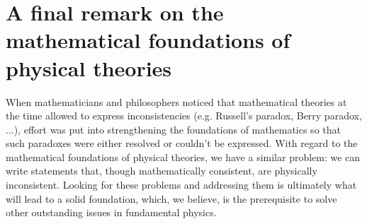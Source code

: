 \documentclass[10pt,twocolumn, nofootinbib]{revtex4-2}
\begin{document}

\section{A final remark on the mathematical foundations of physical theories}

When mathematicians and philosophers noticed that mathematical theories at the time allowed to express inconsistencies (e.g. Russell's paradox, Berry paradox, ...), effort was put into strengthening the foundations of mathematics so that such paradoxes were either resolved or couldn't be expressed. With regard to the mathematical foundations of physical theories, we have a similar problem: we can write statements that, though mathematically consistent, are physically inconsistent. Looking for these problems and addressing them is ultimately what will lead to a solid foundation, which, we believe, is the prerequisite to solve other outstanding issues in fundamental physics.
\end{document}
